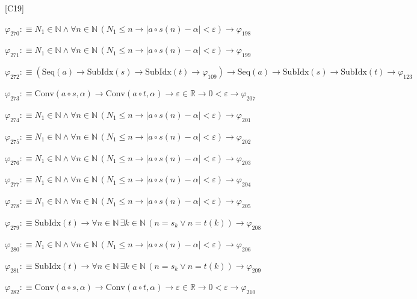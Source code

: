 \begin{fullproof}{[C19]}
\begin{abbrevlist}
\item $\varphi_{270} :\equiv N_{1} \in \mathbb{N} \land \forall n \in \mathbb{N}\,(N_{1} \leq n \to \lvert a \circ s(n) - \alpha \rvert < \varepsilon) \to \varphi_{198}$
\item $\varphi_{271} :\equiv N_{1} \in \mathbb{N} \land \forall n \in \mathbb{N}\,(N_{1} \leq n \to \lvert a \circ s(n) - \alpha \rvert < \varepsilon) \to \varphi_{199}$
\item $\varphi_{272} :\equiv (\mathrm{Seq}(a) \to \mathrm{SubIdx}(s) \to \mathrm{SubIdx}(t) \to \varphi_{109}) \to \mathrm{Seq}(a) \to \mathrm{SubIdx}(s) \to \mathrm{SubIdx}(t) \to \varphi_{123}$
\item $\varphi_{273} :\equiv \mathrm{Conv}(a \circ s,\alpha) \to \mathrm{Conv}(a \circ t,\alpha) \to \varepsilon \in \mathbb{R} \to 0 < \varepsilon \to \varphi_{207}$
\item $\varphi_{274} :\equiv N_{1} \in \mathbb{N} \land \forall n \in \mathbb{N}\,(N_{1} \leq n \to \lvert a \circ s(n) - \alpha \rvert < \varepsilon) \to \varphi_{201}$
\item $\varphi_{275} :\equiv N_{1} \in \mathbb{N} \land \forall n \in \mathbb{N}\,(N_{1} \leq n \to \lvert a \circ s(n) - \alpha \rvert < \varepsilon) \to \varphi_{202}$
\item $\varphi_{276} :\equiv N_{1} \in \mathbb{N} \land \forall n \in \mathbb{N}\,(N_{1} \leq n \to \lvert a \circ s(n) - \alpha \rvert < \varepsilon) \to \varphi_{203}$
\item $\varphi_{277} :\equiv N_{1} \in \mathbb{N} \land \forall n \in \mathbb{N}\,(N_{1} \leq n \to \lvert a \circ s(n) - \alpha \rvert < \varepsilon) \to \varphi_{204}$
\item $\varphi_{278} :\equiv N_{1} \in \mathbb{N} \land \forall n \in \mathbb{N}\,(N_{1} \leq n \to \lvert a \circ s(n) - \alpha \rvert < \varepsilon) \to \varphi_{205}$
\item $\varphi_{279} :\equiv \mathrm{SubIdx}(t) \to \forall n \in \mathbb{N}\,\exists k \in \mathbb{N}\,(n = s_{k} \lor n = t(k)) \to \varphi_{208}$
\item $\varphi_{280} :\equiv N_{1} \in \mathbb{N} \land \forall n \in \mathbb{N}\,(N_{1} \leq n \to \lvert a \circ s(n) - \alpha \rvert < \varepsilon) \to \varphi_{206}$
\item $\varphi_{281} :\equiv \mathrm{SubIdx}(t) \to \forall n \in \mathbb{N}\,\exists k \in \mathbb{N}\,(n = s_{k} \lor n = t(k)) \to \varphi_{209}$
\item $\varphi_{282} :\equiv \mathrm{Conv}(a \circ s,\alpha) \to \mathrm{Conv}(a \circ t,\alpha) \to \varepsilon \in \mathbb{R} \to 0 < \varepsilon \to \varphi_{210}$

\end{abbrevlist}
\end{fullproof}
